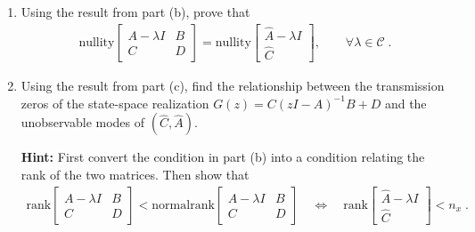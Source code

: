 \begin{enumerate}
\begin{itemize}
\end{itemize}



\item
Using the result from part (b), prove that
\begin{align*}
    \textrm{nullity} \begin{bmatrix}
            A - \lambda I & B \\
            C & D
        \end{bmatrix} = \textrm{nullity} \begin{bmatrix}
            \hat{A} - \lambda I \\
            \hat{C}
        \end{bmatrix}, \qquad \forall \lambda \in \mathcal{C} \; .
\end{align*}



\item
Using the result from part (c), find the relationship between the transmission zeros of the state-space realization $G(z)= C(zI-A)^{-1}B + D$ and the unobservable modes of $(\hat{C},\hat{A})$.

\textbf{Hint:} First convert the condition in part (b) into a condition relating the rank of the two matrices. Then show that
\begin{align*}
    \textrm{rank} \begin{bmatrix}
            A - \lambda I & B \\
            C & D
        \end{bmatrix} < \textrm{normalrank} \begin{bmatrix}
            A - \lambda I & B \\
            C & D
        \end{bmatrix} \quad \Leftrightarrow \quad \textrm{rank} \begin{bmatrix}
            \hat{A} - \lambda I \\
            \hat{C}
        \end{bmatrix} < n_x \; .
\end{align*}

\end{enumerate} 
